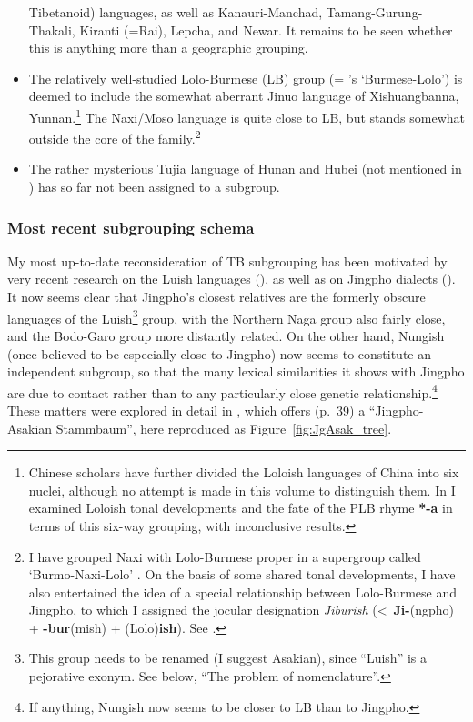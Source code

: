 \begin{itemize}
\mbox{Tibetanoid}) languages, as well as Kanauri-Manchad, Tamang-Gurung-Thakali,
Kiranti (=Rai), Lepcha, and Newar. It remains to be seen whether this is anything more than a geographic grouping.
\item The relatively well-studied Lolo-Burmese (LB) group (= \textit{}’s ‘Burmese-Lolo’) is
deemed to include the somewhat aberrant Jinuo language of Xishuangbanna,
Yunnan.\footnote{Chinese scholars have further divided the Loloish languages of
China into six nuclei, although no attempt is made in this volume to distinguish
them. In \citealt{JAM-PLBA} I examined Loloish tonal developments
and the fate of the PLB rhyme \textbf{*-a} in terms of this six-way grouping, with
inconclusive results.}  The Naxi/Moso language is quite close to LB, but stands
somewhat outside the core of the family.\footnote{I have grouped Naxi with
Lolo-Burmese proper in a supergroup called ‘Burmo-Naxi-Lolo’ \citealt{JAM-JR}.
On the basis of some shared tonal developments, I have also entertained the idea
of a special relationship between Lolo-Burmese and Jingpho, to which I assigned
the jocular designation \textit{Jiburish} (<~\textbf{Ji-}(ngpho)
+ \textbf{-bur}(mish) + (Lolo)\textbf{ish}). See \citealt{JAM-TJLB,JAM-JR}.}
\item The rather mysterious Tujia language of Hunan and Hubei (not mentioned in \textit{}) has so
far not been assigned to a subgroup.
\end{itemize}

\subsubsection{Most recent subgrouping schema}
My most up-to-date reconsideration of TB subgrouping has been motivated by very recent research on the Luish languages (\citealt{HK-Sak,HK-TRPL,DS-Kadu}), as well as on Jingpho dialects (\citealt{KK-TSJD}). It now seems clear that Jingpho’s closest relatives are the formerly obscure languages of the Luish\footnote{This group needs to be renamed (I suggest Asakian), since “Luish” is a pejorative exonym. See below, “The problem of nomenclature”.} group, with the Northern Naga group also fairly close, and the Bodo-Garo group more distantly related. On the other hand, Nungish (once believed to be especially close to Jingpho) now seems to constitute an independent subgroup, so that the many lexical similarities it shows with Jingpho are due to contact rather than to any particularly close genetic relationship.\footnote{If anything, Nungish now seems to be closer to LB than to Jingpho.} These matters were explored in detail in \citealt{JAM-RGPJ}, which offers (p.\ 39) a “Jingpho-Asakian Stammbaum”, here reproduced as Figure~\ref{fig:JgAsak_tree}.


